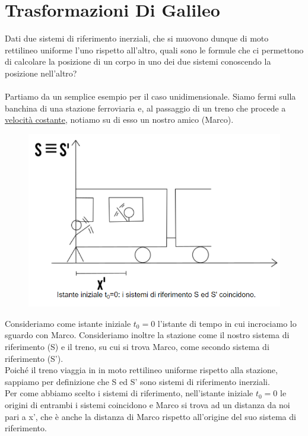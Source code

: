 \documentclass{article}
\begin{document}
\section{Trasformazioni Di Galileo}
Dati due sistemi di riferimento inerziali, che si muovono dunque di moto rettilineo uniforme l'uno rispetto all'altro, quali sono le formule che ci permettono di calcolare la posizione di un corpo in uno dei due sistemi conoscendo la posizione nell'altro?\\\\
Partiamo da un semplice esempio per il caso unidimensionale. Siamo fermi sulla banchina di una stazione ferroviaria e, al passaggio di un treno che procede a \underline{velocità costante}, notiamo su di esso un nostro amico (Marco).
\begin{figure}[H]
    \centering
    \includegraphics[scale=0.5]{Trasformazioni di galileo 1.png}
    \label{fig:my_label}
\end{figure}
\noindent
Consideriamo come istante iniziale $t_{0}=0$ l'istante di tempo in cui incrociamo lo sguardo con Marco. Consideriamo inoltre la stazione come il nostro sistema di riferimento (S) e il treno, su cui si trova Marco, come secondo sistema di riferimento (S').\\
Poiché il treno viaggia in in moto rettilineo uniforme rispetto alla stazione, sappiamo per definizione che S ed S' sono sistemi di riferimento inerziali.\\
Per come abbiamo scelto i sistemi di riferimento, nell'istante iniziale $t_{0}=0$ le origini di entrambi i sistemi coincidono e Marco si trova ad un distanza da noi pari a x', che è anche la distanza di Marco rispetto all'origine del suo sistema di riferimento.\\
\end{document}
